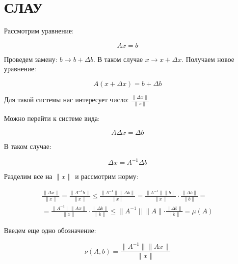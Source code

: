 \documentclass[10pt,a4paper]{article}
\begin{document}
	\section{СЛАУ}
	
	Рассмотрим уравнение:	
	
	\begin{equation}
		Ax = b
	\end{equation}
	
	Проведем замену: $b \rightarrow b + \Delta b$. В таком случае
	$x \rightarrow x + \Delta x$. Получаем новое уравнение:
	
	\begin{equation}
		A\left(x + \Delta x\right) = b + \Delta b
	\end{equation}
	
	Для такой системы нас интересует число: $\frac{\parallel
	\Delta x \parallel}{\parallel x \parallel}$
	
	Можно перейти к системе вида:
	
	\begin{equation}
		A\Delta x = \Delta b
	\end{equation}
	
	В таком случае:
	
	\begin{equation}
		\Delta x = A^{-1}\Delta b
	\end{equation}
	
	Разделим все на $\parallel x \parallel$ и рассмотрим норму:
	
	\begin{eqnarray}
		\frac{\parallel \Delta x \parallel}
		{\parallel x \parallel} = 
		\frac{\parallel A^{-1}b \parallel}{\parallel x \parallel} \leqslant
		\frac{\parallel A^{-1} \parallel \parallel \Delta b \parallel}
		{\parallel x \parallel} = 
		\frac{\parallel A^{-1} \parallel \parallel b \parallel}
		{\parallel x \parallel} \cdot \frac{\parallel \Delta b \parallel}
		{\parallel b \parallel} =\\ 
		=\frac{\parallel A^{-1} \parallel \parallel Ax \parallel}
		{\parallel x \parallel}\cdot \frac{\parallel \Delta b \parallel}
		{\parallel b \parallel} \leqslant 
		\parallel A^{-1} \parallel \parallel A \parallel \cdot
		\frac{\parallel \Delta b \parallel}
		{\parallel b \parallel} = \mu\left(A\right)
	\end{eqnarray}
	
	Введем еще одно обозначение:
	
	\begin{equation}
		\nu\left(A, b\right) = \frac{\parallel A^{-1} \parallel 
		\parallel Ax \parallel}{\parallel x \parallel}
	\end{equation}
	
\end{document}
